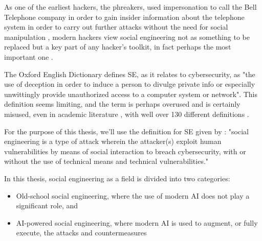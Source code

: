 As one of the earliest hackers, the phreakers, used impersonation to call the Bell Telephone company in order to gain insider information about the telephone system in order to carry out further attacks without the need for social manipulation \citep{hatfieldSocialEngineeringCybersecurity2018a}, modern hackers view social engineering not as something to be replaced but a key part of any hacker's toolkit, in fact perhaps the most important one \citep{mitnickArtDeceptionControlling2003}.

The Oxford English Dictionary defines SE, as it relates to cybersecurity, as "the use of deception in order to induce a person to divulge private info or especially unwittingly provide unauthorized access to a computer system or network". This definition seems limiting, and the term is perhaps overused and is certainly misused, even in academic literature \citep{wangDefiningSocialEngineering2020}, with well over 130 different definitions \citep{hatfieldSocialEngineeringCybersecurity2018a}.

For the purpose of this thesis, we'll use the definition for SE given by \cite{wangDefiningSocialEngineering2020}: "social engineering is a type of attack wherein the attacker(s) exploit human vulnerabilities by means of social interaction to breach cybersecurity, with or without the use of technical means and technical vulnerabilities."



In this thesis, social engineering as a field is divided into two categories:

\begin{itemize}
    \item Old-school social engineering, where the use of modern AI does not play a significant role, and
    \item AI-powered social engineering, where modern AI is used to augment, or fully execute, the attacks and countermeasures
\end{itemize}


